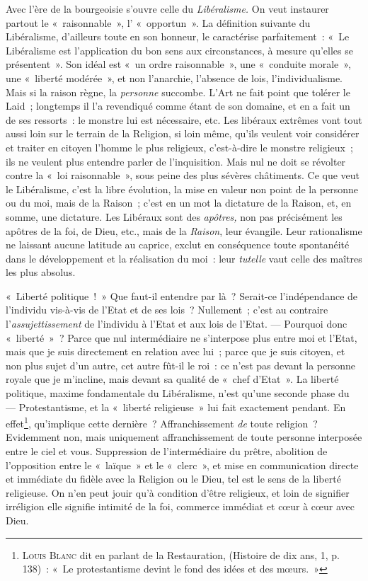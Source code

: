 \documentclass[french,twoside]{book} %
\begin{document}
Avec l’ère de la bourgeoisie s’ouvre celle du \emph{Libéralisme.} On veut instaurer partout le « raisonnable », l’ « opportun ». La définition suivante du Libéralisme, d’ailleurs toute en son honneur, le caractérise parfaitement : « Le Libéralisme est l’application du  bon sens aux circonstances, à mesure qu’elles se présentent ». Son idéal est « un ordre raisonnable », une « conduite morale », une « liberté modérée », et non l’anarchie, l’absence de lois, l’individualisme. Mais si la raison règne, la \emph{personne} succombe. L’Art ne fait point que tolérer le Laid ; longtemps il l’a revendiqué comme étant de son domaine, et en a fait un de ses ressorts : le monstre lui est nécessaire, etc. Les libéraux extrêmes vont tout aussi loin sur le terrain de la Religion, si loin même, qu’ils veulent voir considérer et traiter en citoyen l’homme le plus religieux, c’est-à-dire le monstre religieux ; ils ne veulent plus entendre parler de l’inquisition. Mais nul ne doit se révolter contre la « loi raisonnable », sous peine des plus sévères châtiments. Ce que veut le Libéralisme, c’est la libre évolution, la mise en valeur non point de la personne ou du moi, mais de la Raison ; c’est en un mot la dictature de la Raison, et, en somme, une dictature. Les Libéraux sont des \emph{apôtres,} non pas précisément les apôtres de la foi, de Dieu, etc., mais de la \emph{Raison}, leur évangile. Leur rationalisme ne laissant aucune latitude au caprice, exclut en conséquence toute spontanéité dans le développement et la réalisation du moi : leur \emph{tutelle} vaut celle des maîtres les plus absolus.\par
« Liberté politique ! » Que faut-il entendre par là ? Serait-ce l’indépendance de l’individu vis-à-vis de l’Etat et de ses lois ? Nullement ; c’est au contraire l’\emph{assujettissement} de l’individu à l’Etat et aux lois de l’Etat. — Pourquoi donc « liberté » ? Parce que nul intermédiaire ne s’interpose plus entre moi et l’Etat, mais que je suis directement en relation avec lui ; parce que je suis citoyen, et non plus sujet d’un autre, cet autre fût-il le roi : ce n’est pas devant la personne royale que je m’incline, mais devant sa qualité de « chef d’Etat ». La liberté politique, maxime fondamentale du Libéralisme, n’est qu’une seconde phase du — Protestantisme, et la « liberté religieuse » lui fait exactement pendant. En  effet\footnote{ \noindent L{\scshape ouis} B{\scshape lanc} dit en parlant de la Restauration, (Histoire de dix ans, 1, p. 138) : « Le protestantisme devint le fond des idées et des mœurs. »
 }, qu’implique cette dernière ? Affranchissement \emph{de} toute religion ? Evidemment non, mais uniquement affranchissement de toute personne interposée entre le ciel et vous. Suppression de l’intermédiaire du prêtre, abolition de l’opposition entre le « laïque » et le « clerc », et mise en communication directe et immédiate du fidèle avec la Religion ou le Dieu, tel est le sens de la liberté religieuse. On n’en peut jouir qu’à condition d’être religieux, et loin de signifier irréligion elle signifie intimité de la foi, commerce immédiat et cœur à cœur avec Dieu.\par
\end{document}
